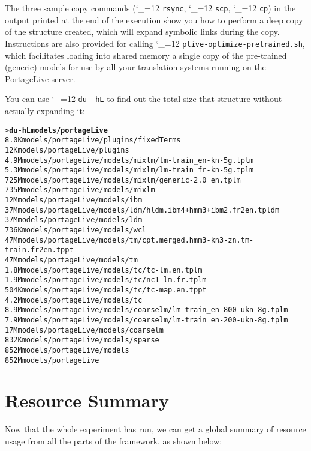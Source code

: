\documentclass[11pt,letterpaper]{article}
\def\code{\begingroup\catcode`\_=12 \codex}
\newcommand{\codex}[1]{\texttt{#1}\endgroup}
\begin{document}
The three sample copy commands (\code{rsync}, \code{scp}, \code{cp}) in the
output printed at the end of the execution show you how to perform a deep copy
of the structure created, which will expand symbolic links during the copy.
Instructions are also provided for calling \code{plive-optimize-pretrained.sh},
which facilitates loading into shared memory a single copy of the pre-trained
(generic) models for use by all your translation systems running on the
PortageLive server.

You can use \code{du -hL} to find out the total size that structure without
actually expanding it:
\begin{small}
\begin{alltt}
   > \textbf{du -hL models/portageLive}
   8.0K    models/portageLive/plugins/fixedTerms
   12K     models/portageLive/plugins
   4.9M    models/portageLive/models/mixlm/lm-train_en-kn-5g.tplm
   5.3M    models/portageLive/models/mixlm/lm-train_fr-kn-5g.tplm
   725M    models/portageLive/models/mixlm/generic-2.0_en.tplm
   735M    models/portageLive/models/mixlm
   12M     models/portageLive/models/ibm
   37M     models/portageLive/models/ldm/hldm.ibm4+hmm3+ibm2.fr2en.tpldm
   37M     models/portageLive/models/ldm
   736K    models/portageLive/models/wcl
   47M     models/portageLive/models/tm/cpt.merged.hmm3-kn3-zn.tm-train.fr2en.tppt
   47M     models/portageLive/models/tm
   1.8M    models/portageLive/models/tc/tc-lm.en.tplm
   1.9M    models/portageLive/models/tc/nc1-lm.fr.tplm
   504K    models/portageLive/models/tc/tc-map.en.tppt
   4.2M    models/portageLive/models/tc
   8.9M    models/portageLive/models/coarselm/lm-train_en-800-ukn-8g.tplm
   7.9M    models/portageLive/models/coarselm/lm-train_en-200-ukn-8g.tplm
   17M     models/portageLive/models/coarselm
   832K    models/portageLive/models/sparse
   852M    models/portageLive/models
   852M    models/portageLive
\end{alltt}
\end{small}


\section{Resource Summary}

Now that the whole experiment has run, we can get a global summary of resource
usage from all the parts of the framework, as shown below:
\end{document}
